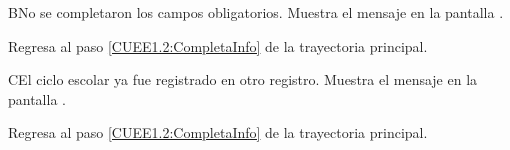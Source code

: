 \begin{UCtrayectoriaA}{B}{No se completaron los campos obligatorios.}
	\UCpaso [\UCsist] Muestra el mensaje  en la pantalla .
	
	\UCpaso Regresa al paso \ref{CUEE1.2:CompletaInfo} de la trayectoria principal.
\end{UCtrayectoriaA}

\begin{UCtrayectoriaA}{C}{El ciclo escolar ya fue registrado en otro registro.}
	\UCpaso [\UCsist] Muestra el mensaje  en la pantalla .
	
	\UCpaso Regresa al paso \ref{CUEE1.2:CompletaInfo} de la trayectoria principal.
\end{UCtrayectoriaA}
